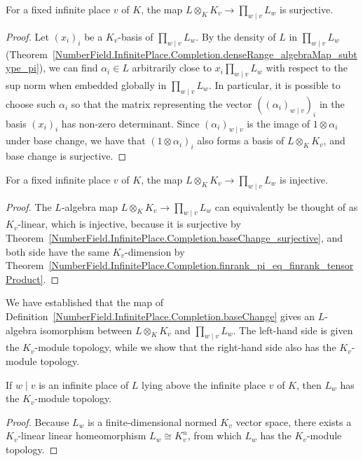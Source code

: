 \begin{theorem}
  \label{NumberField.InfinitePlace.Completion.baseChange_surjective}
  \leanok
  For a fixed infinite place $v$ of $K$, the map $L\otimes_K K_v \to\prod_{w\mid v}L_w$ is
  surjective.
\end{theorem}
\begin{proof}
  Let $(x_i)_i$ be a $K_v$-basis of $\prod_{w\mid v}L_w$. By the density of $L$ in
  $\prod_{w\mid v}L_w$
  (Theorem~\ref{NumberField.InfinitePlace.Completion.denseRange_algebraMap_subtype_pi}), we can
  find $\alpha_i \in L$ arbitrarily close to $x_i\prod_{w\mid v}L_w$ with respect to the sup norm
  when embedded globally in $\prod_{w\mid v}L_w$.
  In particular, it is possible to choose such $\alpha_i$ so that the matrix representing
  the vector $((\alpha_i)_{w \mid v})_i$ in the basis $(x_i)_i$ has non-zero determinant.
  Since $(\alpha_i)_{w \mid v}$ is the image of $1\otimes \alpha_i$ under base change, we have
  that $(1 \otimes \alpha_i)_i$ also forms a basis of $L\otimes_K K_v$, and base change
  is surjective.
\end{proof}

\begin{theorem}
  \label{NumberField.InfinitePlace.Completion.baseChange_injective}
  \leanok
  For a fixed infinite place $v$ of $K$, the map $L\otimes_K K_v \to\prod_{w\mid v}L_w$ is
  injective.
\end{theorem}
\begin{proof}
  The $L$-algebra map $L\otimes_K K_v \to\prod_{w\mid v}L_w$ can equivalently be thought of
  as $K_v$-linear, which is injective, because it is surjective by
  Theorem~\ref{NumberField.InfinitePlace.Completion.baseChange_surjective}, and both side have the same
  $K_v$-dimension by
  Theorem~\ref{NumberField.InfinitePlace.Completion.finrank_pi_eq_finrank_tensorProduct}.
\end{proof}

We have established that the map of
Definition~\ref{NumberField.InfinitePlace.Completion.baseChange} gives an $L$-algebra isomorphism
between $L\otimes_K K_v$ and $\prod_{w\mid v}L_w$.
The left-hand side is given the $K_v$-module topology, while we show that the right-hand side also
has the $K_v$-module topology.
\begin{theorem}
  \label{NumberField.InfinitePlace.Completion.instIsModuleTopologyValEqComapAlgebraMap_fLT}
  \leanok
  If $w \mid v$ is an infinite place of $L$ lying above the infinite place $v$ of $K$, then
  $L_w$ has the $K_v$-module topology.
\end{theorem}
\begin{proof}
  Because $L_w$ is a finite-dimensional normed $K_v$ vector space, there exists a $K_v$-linear
  linear homeomorphism $L_w \cong K_v^n$, from which $L_w$ has the $K_v$-module topology.
\end{proof}

